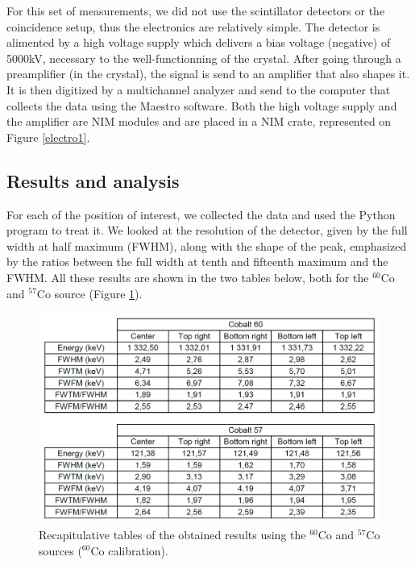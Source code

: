 \documentclass[11pt,a4paper]{article}
\begin{document}
For this set of measurements, we did not use the scintillator detectors or the coincidence setup, thus the electronics are relatively simple. The detector is alimented by a high voltage supply which delivers a bias voltage (negative) of 5000kV, necessary to the well-functionning of the crystal. After going through a preamplifier (in the crystal), the signal is send to an amplifier that also shapes it. It is then digitized by a multichannel analyzer and send to the computer that collects the data using the Maestro software. Both the high voltage supply and the amplifier are NIM modules and are placed in a NIM crate, represented on Figure \ref{electro1}.


\subsection{Results and analysis}


For each of the position of interest, we collected the data and used the Python program to treat it. We looked at the resolution of the detector, given by the full width at half maximum (FWHM), along with the shape of the peak, emphasized by the ratios between the full width at tenth and fifteenth maximum and the FWHM. All these results are shown in the two tables below, both for the $^{60}$Co and $^{57}$Co source (Figure \ref{recap}).

\begin{figure}[!h]
\centering
\includegraphics[scale=0.7]{Scan_Cos.png}
\caption{Recapitulative tables of the obtained results using the $^{60}$Co and $^{57}$Co sources ($^{60}$Co calibration).}
\label{recap}
\end{figure}
\end{document}
